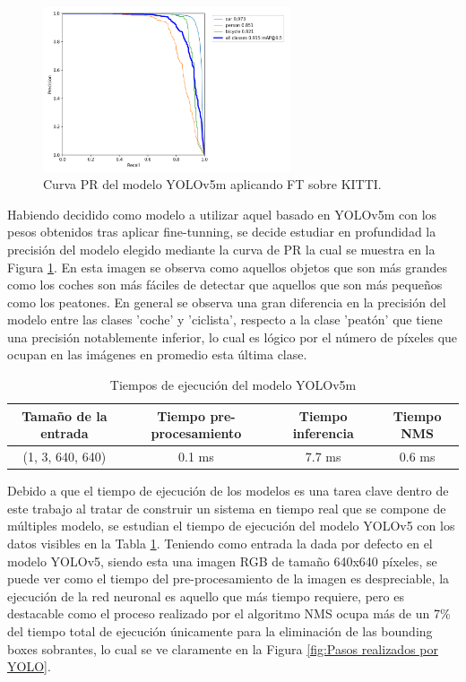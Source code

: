 \begin{figure}[H]
    \centering
    \includegraphics[width=0.65\textwidth]{Book/figures/5_deteccion2d/PR_curve_yolo5m_ft.png}
    \caption{Curva PR del modelo YOLOv5m aplicando FT sobre KITTI.}
    \label{fig:Curva PR del modelo YOLOv5m aplicando FT sobre KITTI.}
\end{figure}

Habiendo decidido como modelo a utilizar aquel basado en YOLOv5m con los pesos obtenidos tras aplicar fine-tunning, se decide estudiar en profundidad la precisión del modelo elegido mediante la curva de \ac{PR} la cual se muestra en la Figura \ref{fig:Curva PR del modelo YOLOv5m aplicando FT sobre KITTI.}. En esta imagen se observa como aquellos objetos que son más grandes como los coches son más fáciles de detectar que aquellos que son más pequeños como los peatones. En general se observa una gran diferencia en la precisión del modelo entre las clases 'coche' y 'ciclista', respecto a la clase 'peatón' que tiene una precisión notablemente inferior, lo cual es lógico por el número de píxeles que ocupan en las imágenes en promedio esta última clase.

\begin{table}[H]
\centering
\begin{tabular}{|cccc|}
\hline
Tamaño de la entrada & Tiempo pre-procesamiento & Tiempo inferencia & Tiempo NMS \\ \hline
(1, 3, 640, 640)     & 0.1 ms                   & 7.7 ms            & 0.6 ms     \\ \hline
\end{tabular}
\caption{Tiempos de ejecución del modelo YOLOv5m}
\label{tab:Tiempos de ejecución del modelo YOLOv5m}
\end{table}

Debido a que el tiempo de ejecución de los modelos es una tarea clave dentro de este trabajo al tratar de construir un sistema en tiempo real que se compone de múltiples modelo, se estudian el tiempo de ejecución del modelo YOLOv5 con los datos visibles en la Tabla \ref{tab:Tiempos de ejecución del modelo YOLOv5m}. Teniendo como entrada la dada por defecto en el modelo YOLOv5, siendo esta una imagen RGB de tamaño 640x640 píxeles, se puede ver como el tiempo del pre-procesamiento de la imagen es despreciable, la ejecución de la red neuronal es aquello que más tiempo requiere, pero es destacable como el proceso realizado por el algoritmo \ac{NMS} ocupa más de un 7\% del tiempo total de ejecución únicamente para la eliminación de las bounding boxes sobrantes, lo cual se ve claramente en la Figura \ref{fig:Pasos realizados por YOLO}.

